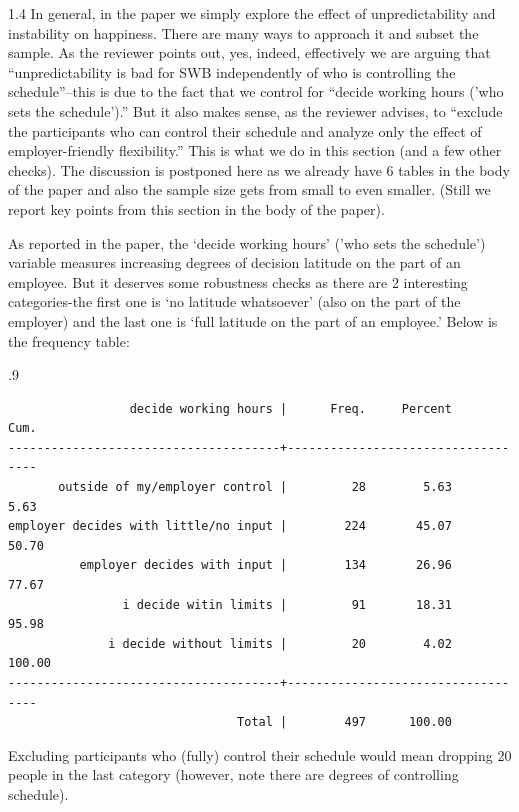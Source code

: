 \documentclass[10pt, letterpaper]{article}
\begin{document}
\begin{spacing}{1.4}
In general, in the paper we simply explore the effect of unpredictability and
instability on happiness. There are many ways to approach it and subset the
sample. As the reviewer points out, yes, indeed, effectively we are arguing that
``unpredictability is bad for SWB independently of who is controlling the schedule''--this is due to the fact that we control for ``decide working hours ('who sets the schedule').'' But it also makes sense, as the reviewer advises,
to ``exclude the participants who can control their schedule and analyze only
the effect of employer-friendly flexibility.'' 
This is what we do in this section
(and a few other checks). The discussion is postponed here as we already have 6
tables in the body of the paper and also the sample size gets from small to even
smaller. (Still we report key points from this section in the body of the paper). 
 
As reported in the paper, the `decide working hours' ('who sets the schedule')
variable measures increasing degrees of decision latitude on the part of an
employee. But it deserves some robustness checks as there are 2 interesting
categories-the first one is `no latitude whatsoever' (also on the part of the
employer) and the last one is `full latitude on the part of an employee.' Below is
the frequency table:

\begin{scriptsize}
\begin{spacing}{.9}
\begin{verbatim}
                 decide working hours |      Freq.     Percent        Cum.
--------------------------------------+-----------------------------------
       outside of my/employer control |         28        5.63        5.63
employer decides with little/no input |        224       45.07       50.70
          employer decides with input |        134       26.96       77.67
                i decide witin limits |         91       18.31       95.98
              i decide without limits |         20        4.02      100.00
--------------------------------------+-----------------------------------
                                Total |        497      100.00
\end{verbatim}
\end{spacing}
\end{scriptsize}

Excluding participants who (fully) control their schedule would mean dropping 20 people in the last category (however, note there are degrees of controlling schedule).


\end{spacing}
\end{document}
